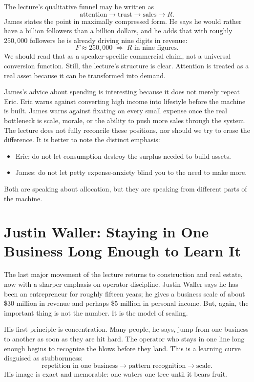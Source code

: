 The lecture's qualitative funnel may be written as
\begin{equation}
\text{attention} \longrightarrow \text{trust} \longrightarrow \text{sales} \longrightarrow R.
\end{equation}
James states the point in maximally compressed form. He says he would rather have a billion followers than a billion dollars, and he adds that with roughly \(250{,}000\) followers he is already driving nine digits in revenue:
\begin{equation}
F \approx 250{,}000 \;\Longrightarrow\; R \text{ in nine figures}.
\end{equation}
We should read that as a speaker-specific commercial claim, not a universal conversion function. Still, the lecture's structure is clear. Attention is treated as a real asset because it can be transformed into demand.

James's advice about spending is interesting because it does not merely repeat Eric. Eric warns against converting high income into lifestyle before the machine is built. James warns against fixating on every small expense once the real bottleneck is scale, morale, or the ability to push more sales through the system. The lecture does not fully reconcile these positions, nor should we try to erase the difference. It is better to note the distinct emphasis:
\begin{itemize}
\item Eric: do not let consumption destroy the surplus needed to build assets.
\item James: do not let petty expense-anxiety blind you to the need to make more.
\end{itemize}
Both are speaking about allocation, but they are speaking from different parts of the machine.

\section{Justin Waller: Staying in One Business Long Enough to Learn It}

The last major movement of the lecture returns to construction and real estate, now with a sharper emphasis on operator discipline. Justin Waller says he has been an entrepreneur for roughly fifteen years; he gives a business scale of about \$30 million in revenue and perhaps \$5 million in personal income. But, again, the important thing is not the number. It is the model of scaling.

His first principle is concentration. Many people, he says, jump from one business to another as soon as they are hit hard. The operator who stays in one line long enough begins to recognize the blows before they land. This is a learning curve disguised as stubbornness:
\begin{equation}
\text{repetition in one business} \longrightarrow \text{pattern recognition} \longrightarrow \text{scale}.
\end{equation}
His image is exact and memorable: one waters one tree until it bears fruit.

